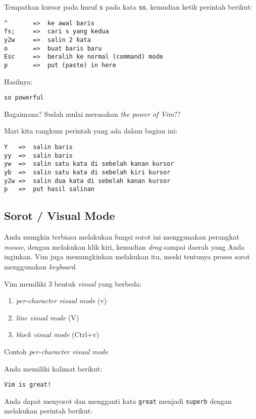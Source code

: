 \documentclass{article}
\begin{document}
Tempatkan kursor pada huruf \verb=s= pada kata \verb=so=,
kemudian ketik perintah berikut:

\begin{verbatim}
^       =>  ke awal baris
fs;     =>  cari s yang kedua
y2w     =>  salin 2 kata
o       =>  buat baris baru
Esc     =>  beralih ke normal (command) mode
p       =>  put (paste) in here
\end{verbatim}

Hasilnya:

\begin{verbatim}
so powerful
\end{verbatim}

Bagaimana? Sudah mulai merasakan \emph{the power of Vim}??

Mari kita rangkum perintah yang ada dalam bagian ini:

\begin{verbatim}
Y   =>  salin baris
yy  =>  salin baris
yw  =>  salin satu kata di sebelah kanan kursor
yb  =>  salin satu kata di sebelah kiri kursor
y2w =>  salin dua kata di sebelah kanan kursor
p   =>  put hasil salinan
\end{verbatim}

\subsection{Sorot / Visual Mode}

Anda mungkin terbiasa melakukan fungsi sorot ini menggunakan
perangkat \emph{mouse}, dengan melakukan klik kiri, kemudian
\emph{drag} sampai daerah yang Anda inginkan. Vim juga
memungkinkan melakukan itu, meski tentunya proses sorot
menggunakan \emph{keyboard}. 

Vim memiliki 3 bentuk \emph{visual} yang berbeda:

\begin{enumerate}
    \item \emph{per-character visual mode} (v)
    \item \emph{line visual mode} (V)
    \item \emph{block visual mode} (Ctrl+v)
\end{enumerate}

Contoh \emph{per-character visual mode}

Anda memiliki kalimat berikut:

\begin{verbatim}
Vim is great!
\end{verbatim}

Anda dapat menyorot dan mengganti kata \verb=great= menjadi
\verb=superb= dengan melakukan perintah berikut:
\end{document}
